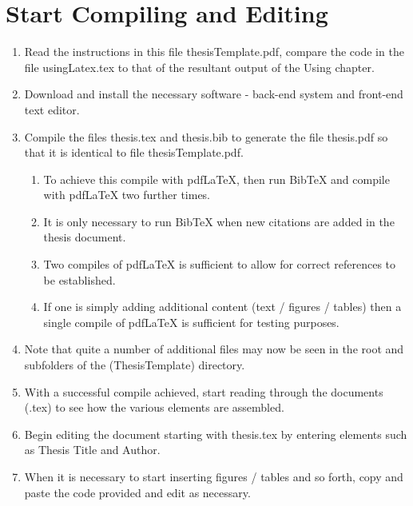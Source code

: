 \section{Start Compiling and Editing}
\begin{enumerate}
\item Read the instructions in this file thesisTemplate.pdf, compare the code in the file usingLatex.tex to that of the resultant output of the Using \latex chapter. 

\item Download and install the necessary software - back-end \latex system and front-end text editor. 

\item Compile the files thesis.tex and thesis.bib to generate the file thesis.pdf so that it is identical to file thesisTemplate.pdf.
\begin{enumerate}
\item To achieve this compile with pdfLaTeX, then run BibTeX and compile with pdfLaTeX two further times.

\item It is only necessary to run BibTeX when new citations are added in the thesis document.

\item Two compiles of pdfLaTeX is sufficient to allow for correct references to be established.

\item If one is simply adding additional content (text / figures / tables) then a single compile of pdfLaTeX is sufficient for testing purposes.
\end{enumerate}
\item Note that quite a number of additional files may now be seen in the root and subfolders of the (ThesisTemplate) directory.

\item With a successful compile achieved, start reading through the \latex documents (.tex) to see how the various elements are assembled.

\item Begin editing the document starting with thesis.tex by entering elements such as Thesis Title and Author.

\item When it is necessary to start inserting figures / tables and so forth, copy and paste the \latex code provided and edit as necessary.
\end{enumerate}

